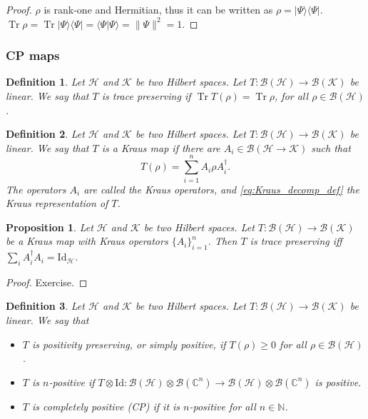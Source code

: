 \documentclass{article}
\newtheorem{proposition}{Proposition}
\newtheorem{definition}{Definition}
\theoremstyle{definition}
\newcommand{\tr}{\operatorname{Tr}}
\newcommand{\id}{\mathrm{Id}}
\newcommand{\ket}[1]{\vert #1 \rangle}
\newcommand{\bra}[1]{\langle #1 \vert}
\newcommand{\scalprod}[2]{\langle #1 \vert #2 \rangle}
\newcommand{\bounded}[1]{\mathcal{B}(#1)}
\begin{document}
\begin{proof}
   $\rho$ is rank-one and Hermitian, thus it can be written as $\rho = \ket{\Psi}\bra{\Psi}$. $\tr \rho = \tr\ket{\Psi} \bra{\Psi} = \scalprod{\Psi}{\Psi} = \|\Psi\|^2 = 1$.
\end{proof}





\subsubsection{CP maps}

\begin{definition}
    Let $\mathcal{H}$ and $\mathcal{K}$ be two Hilbert spaces. Let $T:\bounded{\mathcal{H}}\to\bounded{\mathcal{K}}$ be linear. We say that $T$ is \emph{trace preserving} if $\tr T(\rho) = \tr \rho$, for all $\rho\in\bounded{\mathcal{H}}$.
\end{definition}

\begin{definition}
  Let $\mathcal{H}$ and $\mathcal{K}$ be two Hilbert spaces. Let $T:\bounded{\mathcal{H}}\to\bounded{\mathcal{K}}$ be linear. We say that $T$ is a Kraus map if there are $A_i\in \mathcal{B}(\mathcal{H}\rightarrow \mathcal{K})$ such that 
  \begin{equation}\label{eq:Kraus_decomp_def}
    T(\rho) = \sum_{i=1}^n A_i \rho A_i^\dagger.
  \end{equation}
  The operators $A_i$ are called the Kraus operators, and \cref{eq:Kraus_decomp_def} the Kraus representation of $T$.
\end{definition}

\begin{proposition}
    Let $\mathcal{H}$ and $\mathcal{K}$ be two Hilbert spaces. Let $T:\bounded{\mathcal{H}}\to\bounded{\mathcal{K}}$ be a Kraus map with Kraus operators $\{A_i\}_{i=1}^n$. Then $T$ is trace preserving iff $\sum_i A_i^\dagger A_i = \id_{\mathcal{H}}$.
\end{proposition}
\begin{proof}
  Exercise.
\end{proof}

\begin{definition}
  Let $\mathcal{H}$ and $\mathcal{K}$ be two Hilbert spaces. Let $T:\bounded{\mathcal{H}}\to\bounded{\mathcal{K}}$ be linear. We say that 
  \begin{itemize}
    \item $T$ is \emph{positivity preserving}, or simply \emph{positive}, if $T(\rho)\geq 0$ for all $\rho\in\bounded{\mathcal{H}}$. 
    \item $T$ is $n$-positive if $T\otimes\id: \bounded{\mathcal{H}}\otimes\bounded{\mathbb{C}^n} \to \bounded{\mathcal{H}} \otimes \bounded{\mathbb{C}^n}$ is positive.
    \item $T$ is \emph{completely positive (CP)} if it is $n$-positive for all $n\in\mathbb{N}$.
  \end{itemize}
\end{definition}
\end{document}
